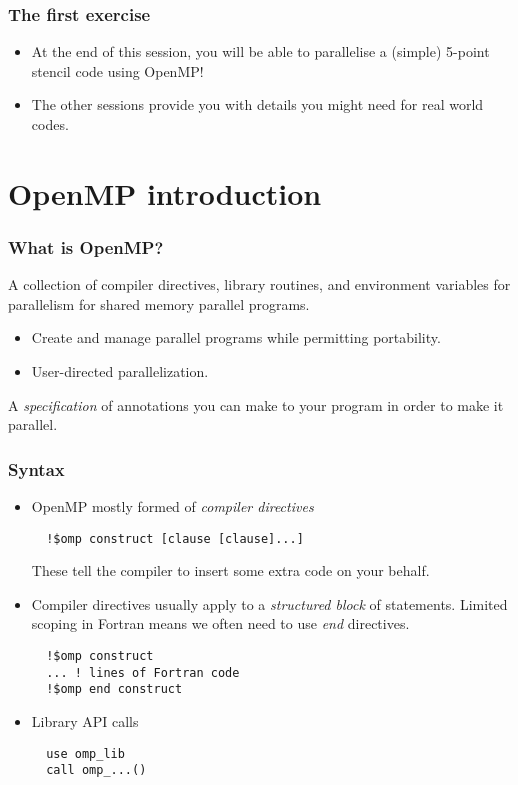 \documentclass{beamer}
\begin{document}
\begin{frame}
\frametitle{The first exercise}
\begin{itemize}
  \item At the end of this session, you will be able to parallelise a (simple) 5-point stencil code using OpenMP!
  \item The other sessions provide you with details you might need for real world codes.
\end{itemize}
\end{frame}

\section{OpenMP introduction}
\begin{frame}
\frametitle{What is OpenMP?}

A collection of compiler directives, library routines, and environment variables for parallelism for shared memory parallel programs.

\begin{itemize}
  \item Create and manage parallel programs while permitting portability.
  \item User-directed parallelization.
\end{itemize}

A \emph{specification} of annotations you can make to your program in order to make it parallel.

\end{frame}

\begin{frame}[fragile]
\frametitle{Syntax}
\begin{itemize}
\item OpenMP mostly formed of \emph{compiler directives}\\
  \begin{verbatim}
  !$omp construct [clause [clause]...]
  \end{verbatim}
  These tell the compiler to insert some extra code on your behalf.

\item Compiler directives usually apply to a \emph{structured block} of statements.
Limited scoping in Fortran means we often need to use \emph{end} directives.
  \begin{verbatim}
  !$omp construct
  ... ! lines of Fortran code
  !$omp end construct
  \end{verbatim}

\item Library API calls
  \begin{verbatim}
  use omp_lib
  call omp_...()
  \end{verbatim}

\end{itemize}
\end{frame}
\end{document}
